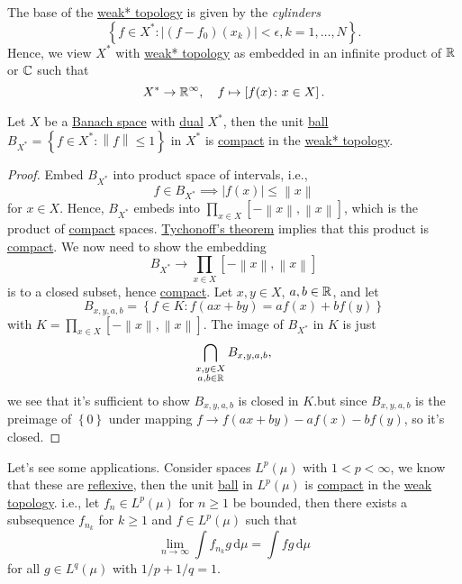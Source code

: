 The base of the \hyperref[def:weak*-topology]{weak* topology} is given by the \emph{cylinders}
\[
	\left\{ f\in X^{\ast} \colon \left\vert (f-f_0)(x_k) \right\vert < \epsilon , k = 1, \ldots , N \right\}.
\]
Hence, we view \(X^{\ast} \) with \hyperref[def:weak*-topology]{weak* topology} as embedded in an infinite product of \(\mathbb{\MakeUppercase{r}} \) or \(\mathbb{\MakeUppercase{c}} \) such that
\[
	X^{\ast} \to \mathbb{\MakeUppercase{r}} ^{\infty },\quad f\mapsto \left[ f(x)\colon x\in X \right] .
\]
\begin{theorem}\label{thm:Banach-Alaoglu}
	Let \(X\) be a \hyperref[def:Banach-space]{Banach space} with \hyperref[def:dual-space]{dual} \(X^{\ast} \), then the unit \hyperref[def:ball]{ball} \(B_{X^{\ast} }= \left\{ f\in X^{\ast} \colon \left\lVert f\right\rVert \leq 1 \right\}\) in \(X^{\ast} \) is \hyperref[def:compact]{compact} in the \hyperref[def:weak*-topology]{weak* topology}.
\end{theorem}
\begin{proof}
	Embed \(B_{X^{\ast} }\) into product space of intervals, i.e.,
	\[
		f\in B_{X^{\ast} }\implies \left\vert f(x) \right\vert \leq \left\lVert x\right\rVert
	\]
	for \(x\in X\). Hence, \(B_{X^{\ast} }\) embeds into \(\prod_{x\in X} [-\left\lVert x\right\rVert , \left\lVert x\right\rVert]\), which is the product of \hyperref[def:compact]{compact} spaces. \href{https://en.wikipedia.org/wiki/Tychonoff's_theorem}{Tychonoff's theorem} implies that this product is \hyperref[def:compact]{compact}. We now need to show the embedding
	\[
		B_{X^{\ast} } \to \prod_{x\in X} [-\left\lVert x\right\rVert , \left\lVert x\right\rVert ]
	\]
	is to a closed subset, hence \hyperref[def:compact]{compact}. Let \(x, y\in X\), \(a, b\in \mathbb{\MakeUppercase{r}} \), and let
	\[
		B_{x, y, a, b} = \left\{ f\in K\colon f(ax+by) = af(x) + bf(y) \right\}
	\]
	with \(K = \prod_{x\in X}[-\left\lVert x\right\rVert , \left\lVert x\right\rVert ]\). The image of \(B_{X^{\ast} }\) in \(K\) is just
	\[
		\bigcap_{\substack{x, y\in X\\ a, b\in \mathbb{\MakeUppercase{r}} }}B_{x, y, a, b},
	\]
	we see that it's sufficient to show \(B_{x, y, a, b}\) is closed in \(K\).but since \(B_{x, y, a, b}\) is the preimage of \(\left\{ 0 \right\} \) under mapping \(f \to f(ax+by) - af(x) - bf(y)\), so it's closed.
\end{proof}

Let's see some applications. Consider spaces \(L^p(\mu )\) with \(1 < p < \infty\), we know that these are \hyperref[def:reflexive-space]{reflexive}, then the unit \hyperref[def:ball]{ball} in \(L^p(\mu )\) is \hyperref[def:compact]{compact} in the \hyperref[def:weak-topology]{weak topology}. i.e., let \(f_n\in L^p(\mu )\) for \(n \geq 1\) be bounded, then there exists a subsequence \(f_{n_k}\) for \(k\geq 1\) and \(f\in L^p(\mu )\) such that
\[
	\lim_{n \to \infty} \int f_{n_k}g\,\mathrm{d} \mu = \int fg\,\mathrm{d} \mu
\]
for all \(g\in L^{q}(\mu )\) with \(1 / p + 1 / q = 1\).

